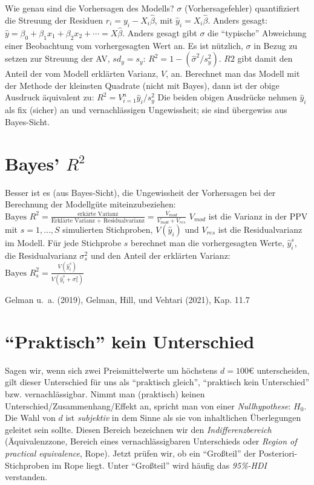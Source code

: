 \documentclass[
  a4paper,
  DIV=11]{scrreprt}
\theoremstyle{definition}
\theoremstyle{remark}
\begin{document}
Wie genau sind die Vorhersagen des Modells? \(\sigma\)
(Vorhersagefehler) quantifiziert die Streuung der Residuen
\(r_i = y_i - X_i\hat{\beta}\), mit \(\hat{y}_i = X_i\hat{\beta}\).
Anders gesagt:
\(\hat{y} = \beta_0 + \beta_1x_1 + \beta_2x_2 + \cdots = X\hat{\beta}\).
Anders gesagt gibt \(\sigma\) die ``typische'' Abweichung einer
Beobachtung vom vorhergesagten Wert an. Es ist nützlich, \(\sigma\) in
Bezug zu setzen zur Streuung der AV, \(sd_y=s_y\):
\(R^2 = 1- (\hat{\sigma}^2/s^2_y)\). \(R2\) gibt damit den Anteil der
vom Modell erklärten Varianz, \(V\), an. Berechnet man das Modell mit
der Methode der kleinsten Quadrate (nicht mit Bayes), dann ist der obige
Ausdruck äquivalent zu: \(R^2=V_{i=1}^n \hat{y}_i/s_y^2\) Die beiden
obigen Ausdrücke nehmen \(\hat{y}_i\) als fix (sicher) an und
vernachlässigen Ungewissheit; sie sind übergewiss aus Bayes-Sicht.

\hypertarget{bayes-r2}{%
\section{\texorpdfstring{Bayes'
\(R^2\)}{Bayes' R\^{}2}}\label{bayes-r2}}

Besser ist es (aus Bayes-Sicht), die Ungewissheit der Vorhersagen bei
der Berechnung der Modellgüte miteinzubeziehen:
\(\text{Bayes }R^2 = \frac{\text{erkärte Varianz}}{\text{Erklärte Varianz + Residualvarianz}}= \frac{V_{mod}}{V_{mod} + V_{res}}\)
\(V_{mod}\) ist die Varianz in der PPV mit \(s = 1, \ldots, S\)
simulierten Stichproben, \(V(\hat{y}_i)\) und \(V_{res}\) ist die
Residualvarianz im Modell. Für jede Stichprobe \(s\) berechnet man die
vorhergesagten Werte, \(\hat{y}_i^s\), die Residualvarianz
\(\sigma^2_s\) und den Anteil der erklärten Varianz:
\(\text{Bayes }R^2_s = \frac{V(\hat{y}_i^s)}{V(\hat{y}_i^s+\sigma_s^2)}\)

Gelman u.~a. (2019), Gelman, Hill, und Vehtari (2021), Kap. 11.7

\hypertarget{praktisch-kein-unterschied}{%
\section{``Praktisch'' kein
Unterschied}\label{praktisch-kein-unterschied}}

Sagen wir, wenn sich zwei Preismittelwerte um höchstens \(d=100\)€
unterscheiden, gilt dieser Unterschied für uns als ``praktisch gleich'',
``praktisch kein Unterschied'' bzw. vernachlässigbar. Nimmt man
(praktisch) keinen Unterschied/Zusammenhang/Effekt an, spricht man von
einer \emph{Nullhypothese}: \(H_0\). Die Wahl von \(d\) ist
\emph{subjektiv} in dem Sinne als sie von inhaltlichen Überlegungen
geleitet sein sollte. Diesen Bereich bezeichnen wir den
\emph{Indifferenzbereich} (Äquivalenzzone, Bereich eines
vernachlässigbaren Unterschieds oder \emph{Region of practical
equivalence}, Rope). Jetzt prüfen wir, ob ein ``Großteil'' der
Posteriori-Stichproben im Rope liegt. Unter ``Großteil'' wird häufig das
\emph{95\%-HDI} verstanden.
\end{document}
